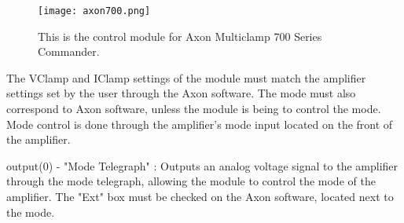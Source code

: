 \label{axon700commander}

\begin{figure}[h]
\begin{center}
\texttt{[image: axon700.png]}
\caption[axon700]{This is the control module for Axon Multiclamp 700 Series Commander.}
\end{center}
\end{figure}

The VClamp and IClamp settings of the module must match the amplifier settings set by the user through the Axon software. The mode must also correspond to Axon software, unless the module is being to control the mode. Mode control is done through the amplifier's mode input located on the front of the amplifier.

output(0) - "Mode Telegraph" : Outputs an analog voltage signal to the amplifier through the mode telegraph, allowing the module to control the mode of the amplifier. The "Ext" box must be checked on the Axon software, located next to the mode.